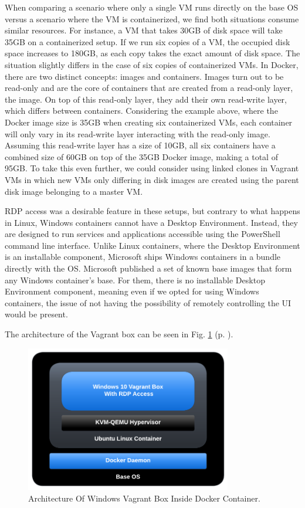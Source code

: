 When comparing a scenario where only a single VM runs directly on the base OS versus a scenario where the VM is containerized, we find both situations consume similar resources. For instance, a VM that takes 30GB of disk space will take 35GB on a containerized setup. If we run six copies of a VM, the occupied disk space increases to 180GB, as each copy takes the exact amount of disk space. The situation slightly differs in the case of six copies of containerized VMs. In Docker, there are two distinct concepts: images and containers. Images turn out to be read-only and are the core of containers that are created from a read-only layer, the image. On top of this read-only layer, they add their own read-write layer, which differs between containers. Considering the example above, where the Docker image size is 35GB when creating six containerized VMs, each container will only vary in its read-write layer interacting with the read-only image. Assuming this read-write layer has a size of 10GB, all six containers have a combined size of 60GB on top of the 35GB Docker image, making a total of 95GB. To take this even further, we could consider using linked clones in Vagrant VMs in which new VMs only differing in disk images are created using the parent disk image belonging to a master VM.

RDP access was a desirable feature in these setups, but contrary to what happens in Linux,  Windows containers cannot have a Desktop Environment. Instead, they are designed to run services and applications accessible using the PowerShell command line interface. Unlike Linux containers, where the Desktop Environment is an installable component, Microsoft ships Windows containers in a bundle directly with the OS. Microsoft published a set of known base images that form any Windows container's base. For them, there is no installable Desktop Environment component, meaning even if we opted for using Windows containers, the issue of not having the possibility of remotely controlling the UI would be present.

The architecture of the Vagrant box can be seen in Fig. \ref{fig:windows_vagrant_box_architecture} (p. \pageref{fig:windows_vagrant_box_architecture}).

\begin{figure}[H]
    \includegraphics[width=9cm]{figures/vagrant_box_container_diagram.pdf}
    \caption{Architecture Of Windows Vagrant Box Inside Docker Container.}
    \label{fig:windows_vagrant_box_architecture}
\end{figure}

